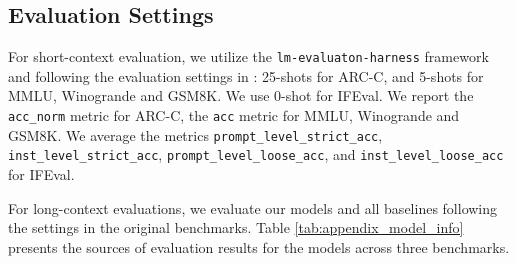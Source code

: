\subsection{Evaluation Settings}
\label{sec:appendix_eval_settings}
For short-context evaluation, we utilize the \texttt{lm-evaluaton-harness} framework \cite{eval-harness} and following the evaluation settings in \citep{open-llm-leaderboard}: 25-shots for ARC-C, and 5-shots for MMLU, Winogrande and GSM8K. We use 0-shot for IFEval. We report the \texttt{acc\_norm} metric for ARC-C, the \texttt{acc} metric for MMLU, Winogrande and GSM8K. We average the metrics \texttt{prompt\_level\_strict\_acc}, \texttt{inst\_level\_strict\_acc}, \texttt{prompt\_level\_loose\_acc}, and \texttt{inst\_level\_loose\_acc} for IFEval. 

For long-context evaluations, we evaluate our models and all baselines following the settings in the original benchmarks. Table \ref{tab:appendix_model_info}  presents the sources of evaluation results for the models across three benchmarks.

